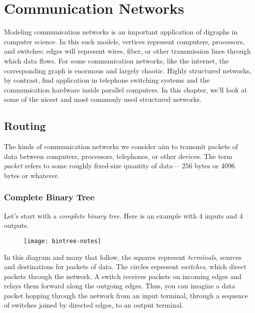 
\chapter{Communication Networks}\label{comm_net_chap}

Modeling communication networks%
%
is an important application of digraphs in
computer science.  In this such models, vertices represent computers,
processors, and switches; edges will represent wires, fiber, or other
transmission lines through which data flows.  For some communication
networks, like the internet, the corresponding graph is enormous and
largely chaotic.  Highly structured networks, by contrast, find
application in telephone switching systems and the communication hardware
inside parallel computers.  In this chapter, we'll look at some of the
nicest and most commonly used structured networks.

\section{Routing}

The kinds of communication networks we consider aim to transmit packets of
data between computers, processors, telephones, or other devices.  The
term \emph{packet} refers to some roughly fixed-size quantity of data---
256 bytes or 4096 bytes or whatever.

\subsection{Complete Binary Tree}

Let's start with a \emph{complete 
binary tree}.  Here is an example
with 4 inputs and 4 outputs.
\begin{figure}
\texttt{[image: bintree-notes]}
\end{figure}
In this diagram and many that
follow, the squares represent \emph{terminals}, sources and destinations
for packets of data.  The circles represent \emph{switches}, which direct
packets through the network.  A switch receives packets on incoming edges
and relays them forward along the outgoing edges.  Thus, you can imagine a
data packet hopping through the network from an input terminal, through a
sequence of switches joined by directed edges, to an output terminal.

